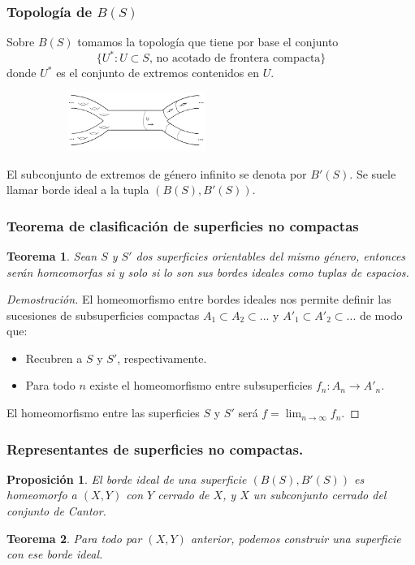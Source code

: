 \documentclass{beamer}
\newtheorem*{teor}{Teorema}
\newtheorem*{prop}{Proposición}
\begin{document}
\begin{frame}
\frametitle{Topología de $B(S)$}
Sobre $B(S)$ tomamos la topología que tiene por base el conjunto \[\{U^*: U\subset S \text{, no acotado de frontera compacta}\}\]donde $U^*$ es el conjunto de extremos contenidos en $U$.
\begin{figure}[htb]
\begin{center}
\includegraphics[width=2.5in,height=0.75in]{imagenes/diapoX.png} 
\end{center}
\end{figure}

El subconjunto de extremos de género infinito se denota por $B'(S)$. Se suele llamar borde ideal a la tupla $(B(S), B'(S))$.
\end{frame}
 

\begin{frame}
\frametitle{Teorema de clasificación de superficies no compactas}

\begin{teor}
Sean $S$ y $S'$ dos superficies orientables del mismo género, entonces serán homeomorfas si y solo si lo son sus bordes ideales como tuplas de espacios.
\end{teor}

\begin{proof}[Demostración]
El homeomorfismo entre bordes ideales nos permite definir las sucesiones de subsuperficies compactas $A_1 \subset A_2 \subset ...$ y $A'_1 \subset A'_2 \subset ...$ de modo que:
\begin{itemize}
\item Recubren a $S$ y $S'$, respectivamente.
\item Para todo $n$ existe el homeomorfismo entre subsuperficies $f_n: A_n \longrightarrow A'_n$.
\end{itemize} 
El homeomorfismo entre las superficies $S$ y $S'$ será $f = \lim_{n\to\infty} f_n$.

\end{proof}

\end{frame}


\begin{frame}
\frametitle{Representantes de superficies no compactas.}


\begin{prop}
El borde ideal de una superficie $(B(S), B'(S))$ es homeomorfo a $(X,Y)$ con $Y$ cerrado de $X$, y $X$ un subconjunto cerrado del conjunto de Cantor.
\end{prop}

\begin{teor}
Para todo par $(X,Y)$ anterior, podemos construir una superficie con ese borde ideal.
\end{teor}


\end{frame}
\end{document}
